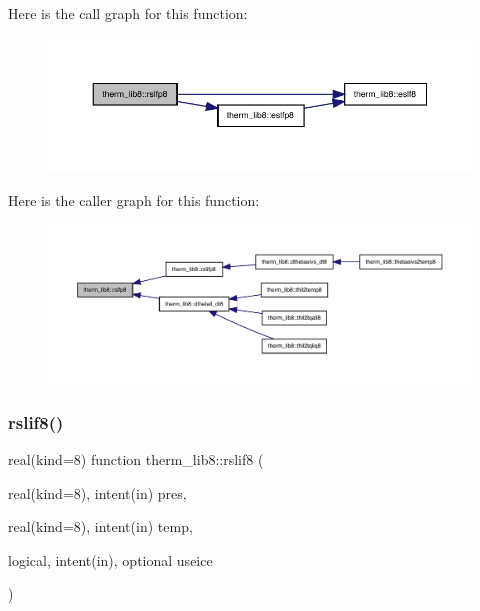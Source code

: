 Here is the call graph for this function\+:
\nopagebreak
\begin{figure}[H]
\begin{center}
\leavevmode
\includegraphics[width=350pt]{namespacetherm__lib8_a73403657254241b151da2ab205ab477f_cgraph}
\end{center}
\end{figure}
Here is the caller graph for this function\+:
\nopagebreak
\begin{figure}[H]
\begin{center}
\leavevmode
\includegraphics[width=350pt]{namespacetherm__lib8_a73403657254241b151da2ab205ab477f_icgraph}
\end{center}
\end{figure}
\mbox{\label{namespacetherm__lib8_a0f62e29f88493f7bc240060f337ade98}} 
\subsubsection{\texorpdfstring{rslif8()}{rslif8()}}
{\footnotesize\ttfamily real(kind=8) function therm\+\_\+lib8\+::rslif8 (\begin{DoxyParamCaption}\item[{real(kind=8), intent(in)}]{pres,  }\item[{real(kind=8), intent(in)}]{temp,  }\item[{logical, intent(in), optional}]{useice }\end{DoxyParamCaption})}

